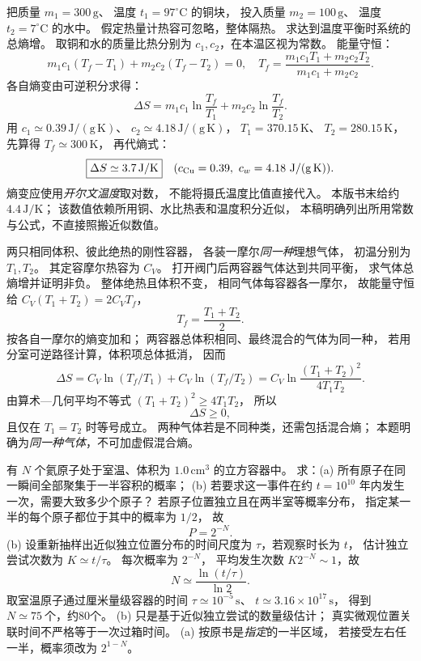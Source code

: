 把质量 $m_1=300\,\mathrm g$、
温度 $t_1=97^\circ\mathrm C$ 的铜块，
投入质量 $m_2=100\,\mathrm g$、
温度 $t_2=7^\circ\mathrm C$ 的水中。
假定热量计热容可忽略，整体隔热。
求达到温度平衡时系统的总熵增。
\exsolution
取铜和水的质量比热分别为
$c_1,c_2$，在本温区视为常数。
能量守恒：
\[
m_1c_1(T_f-T_1)+m_2c_2(T_f-T_2)=0,
\quad
T_f=\frac{m_1c_1T_1+m_2c_2T_2}
{m_1c_1+m_2c_2}.
\]
各自熵变由可逆积分求得：
\[
\boxed{\Delta S=
m_1c_1\ln\frac{T_f}{T_1}
+m_2c_2\ln\frac{T_f}{T_2}}.
\]
用 $c_1\simeq0.39\,\mathrm{J/(g\,K)}$、
$c_2\simeq4.18\,\mathrm{J/(g\,K)}$，
$T_1=370.15\,\mathrm K$、
$T_2=280.15\,\mathrm K$，
先算得 $T_f\simeq300\,\mathrm K$，
再代熵式：
\[
\boxed{\Delta S\simeq3.7\,\mathrm{J/K}}
\quad(c_{\rm Cu}=0.39,\ c_w=4.18\ \mathrm{J/(g\,K)}).
\]
\excheck 熵变应使用\emph{开尔文温度}取对数，
不能将摄氏温度比值直接代入。
本版书末给约 $4.4\,\mathrm{J/K}$；
该数值依赖所用铜、水比热表和温度积分近似，
本稿明确列出所用常数与公式，不直接照搬近似数值。

两只相同体积、彼此绝热的刚性容器，
各装一摩尔\emph{同一种}理想气体，
初温分别为 $T_1,T_2$。
其定容摩尔热容为 $C_V$。
打开阀门后两容器气体达到共同平衡，
求气体总熵增并证明非负。
\exsolution
整体绝热且体积不变，
相同气体每容器各一摩尔，
故能量守恒给
$C_V(T_1+T_2)=2C_VT_f$，
\[
T_f=\frac{T_1+T_2}{2}.
\]
按各自一摩尔的熵变加和；
两容器总体积相同、最终混合的气体为同一种，
若用分室可逆路径计算，体积项总体抵消，
因而
\[
\Delta S=C_V\ln(T_f/T_1)
+C_V\ln(T_f/T_2)
=\boxed{C_V\ln\frac{(T_1+T_2)^2}{4T_1T_2}}.
\]
由算术—几何平均不等式
$(T_1+T_2)^2\ge4T_1T_2$，
所以
\[
\boxed{\Delta S\ge0},
\]
且仅在 $T_1=T_2$ 时等号成立。
\excheck 两种气体若是不同种类，还需包括混合熵；
本题明确为\emph{同一种气体}，不可加虚假混合熵。

有 $N$ 个氦原子处于室温、体积为
$1.0\,\mathrm{cm^3}$ 的立方容器中。
求：(a) 所有原子在同一瞬间全部聚集于一半容积的概率；
(b) 若要求这一事件在约
$t=10^{10}$ 年内发生一次，需要大致多少个原子？
\exsolution
若原子位置独立且在两半室等概率分布，
指定某一半的每个原子都位于其中的概率为 $1/2$，
故
\[
\boxed{P=2^{-N}}.
\]
(b) 设重新抽样出近似独立位置分布的时间尺度为
$\tau$，若观察时长为 $t$，
估计独立尝试次数为 $K\simeq t/\tau$。
每次概率为 $2^{-N}$，
平均发生次数 $K2^{-N}\sim1$，故
\[
\boxed{N\simeq\frac{\ln(t/\tau)}{\ln2}}.
\]
取室温原子通过厘米量级容器的时间
$\tau\simeq10^{-5}\,\mathrm s$、
$t\simeq3.16\times10^{17}\,\mathrm s$，
得到
$\boxed{N\simeq75\ \text{个，约80个}}$。
\excheck (b) 只是基于近似独立尝试的数量级估计；
真实微观位置关联时间不严格等于一次过箱时间。
(a) 按原书是\emph{指定}的一半区域，
若接受左右任一半，概率须改为 $2^{1-N}$。

